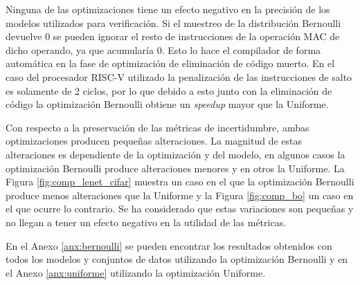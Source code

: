 Ninguna de las optimizaciones tiene un efecto negativo en la precisión de los modelos utilizados para verificación. Si el muestreo de la distribución Bernoulli devuelve 0 se pueden ignorar el resto de instrucciones de la operación MAC de dicho operando, ya que acumularía 0. Esto lo hace el compilador de forma automática en la fase de optimización de eliminación de código muerto. En el caso del procesador RISC-V utilizado la penalización de las instrucciones de salto es solamente de 2 ciclos, por lo que debido a esto junto con la eliminación de código la optimización Bernoulli obtiene un \textit{speedup} mayor que la Uniforme.

Con respecto a la preservación de las métricas de incertidumbre, ambas optimizaciones producen pequeñas alteraciones. La magnitud de estas alteraciones es dependiente de la optimización y del modelo, en algunos casos la optimización Bernoulli produce alteraciones menores y en otros la Uniforme. La Figura \ref{fig:comp_lenet_cifar} muestra un caso en el que la optimización Bernoulli produce menos alteraciones que la Uniforme y la Figura \ref{fig:comp_bo} un caso en el que ocurre lo contrario. Se ha considerado que estas variaciones son pequeñas y no llegan a tener un efecto negativo en la utilidad de las métricas.

En el Anexo \ref{anx:bernoulli} se pueden encontrar los resultados obtenidos con todos los modelos y conjuntos de datos utilizando la optimización Bernoulli y en el Anexo \ref{anx:uniforme} utilizando la optimización Uniforme.


